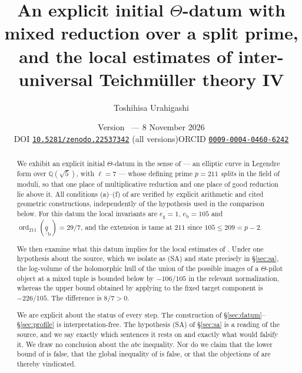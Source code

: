 \documentclass[11pt]{article}
\title{An explicit initial $\Theta$-datum with mixed reduction over a split prime,
and the local estimates of inter-universal Teichm\"uller theory IV}
\author{Toshihisa Urahigashi}
\date{Version \PaperVersion\ --- 8 November 2026\\[3pt]
\small DOI \href{https://doi.org/10.5281/zenodo.22537342}{\texttt{10.5281/zenodo.22537342}} (all versions)\qquad ORCID \href{https://orcid.org/0009-0004-0460-6242}{\texttt{0009-0004-0460-6242}}}
\theoremstyle{plain}
\theoremstyle{definition}
\newcommand{\SA}{\textup{(SA)}}
\newcommand{\ord}{\operatorname{ord}}
\begin{document}
\maketitle

\begin{center}\end{center}
\medskip

\begin{abstract}
We exhibit an explicit initial $\Theta$-datum in the sense of
\cite[Definition 3.1]{IUT1} --- an elliptic curve in Legendre form over
$\mathbb{Q}(\sqrt5)$, with $\ell=7$ --- whose defining prime $p=211$
\emph{splits} in the field of moduli, so that one place of multiplicative
reduction and one place of good reduction lie above it.  All conditions (a)--(f) of \cite[Definition 3.1]{IUT1}
are verified by explicit arithmetic and cited geometric constructions,
independently of the hypothesis used in the comparison below.  For this datum the local invariants are
$e_{\mathrm{g}}=1$, $e_{\mathrm{b}}=105$ and
$\ord_{211}(\underline{\underline q}_{\mathrm{b}})=29/7$, and the extension is
tame at $211$ since $105\le 209=p-2$.

We then examine what this datum implies for the local estimates of
\cite[Theorem 1.10, proof, Step (v)]{IUT4}.  Under one hypothesis about the source, which we
isolate as \SA{} and state precisely in \S\ref{sec:sa}, the log-volume of the
holomorphic hull of the union of the possible images of a $\Theta$-pilot object
at a mixed tuple is bounded below by $-106/105$ in the relevant normalization,
whereas the upper bound obtained by applying \cite[Proposition 1.4(iii)]{IUT4} to
the fixed target component is $-226/105$.  The difference is $8/7>0$.

We are explicit about the status of every step.  The construction of
\S\ref{sec:datum}--\S\ref{sec:profile} is interpretation-free.  The hypothesis
\SA{} of \S\ref{sec:sa} is a reading of the source, and we say exactly which
sentences it rests on and exactly what would falsify it.  We draw no conclusion about the $abc$ inequality.  Nor do we claim
that the lower bound of
\cite[Corollary 3.12]{IUT3} is false, that the global inequality of
\cite[Theorem 1.10]{IUT4} is false, or that the objections of \cite{SS} are
thereby vindicated.
\end{abstract}
\end{document}
